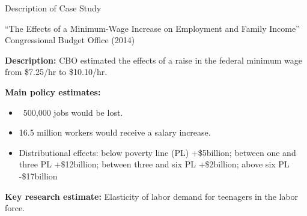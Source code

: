 \documentclass{beamer}
\begin{document}
\begin{frame}[label =  desc_cs]{Description of Case Study}
\begin{center}
``The Effects of a Minimum-Wage Increase on Employment and Family Income'' 
Congressional Budget Office (2014)
\end{center}

\textbf{Description:} CBO estimated the effects of a raise in the federal minimum wage from \$7.25/hr to \$10.10/hr. 


\textbf{Main policy estimates:}
\begin{itemize}
\item ~500,000 jobs would be lost.
\item 16.5 million workers would receive a salary increase. 
\item Distributional effects: below poverty line (PL) +\$5billion; between one and three PL +\$12billion; between three and six PL +\$2billion; above six PL -\$17billion
\end{itemize}

\textbf{Key research estimate:} Elasticity of labor demand for teenagers in the labor force. 
\end{frame}

\end{document}
